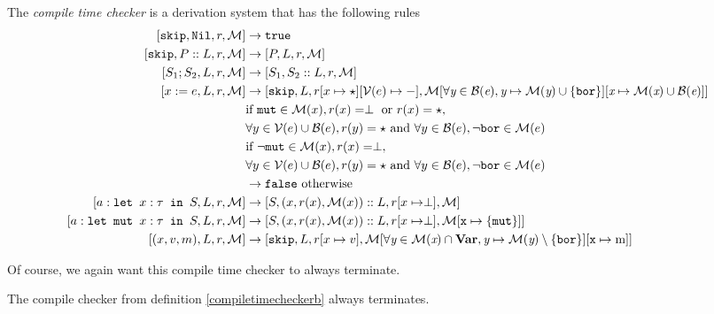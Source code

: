 \begin{definition}
\label{compiletimecheckerb}
The \emph{compile time checker} is a derivation system that has the following rules
\begin{align*}
\ccb{\texttt{skip}}{\texttt{Nil}}{r}{M} & \to \texttt{true}  \\
\ccb{\texttt{skip}}{P::L}{r}{M}       & \to \ccb{P}{L}{r}{M}  \\
\ccb{S_1; S_2}{L}{r}{M}                 & \to \ccb{S_1}{S_2::L}{r}{M}  \\
\ccb{x:=e}{L}{r}{M}                     & \to \ccb{\texttt{skip}}{L}{r[x\mapsto \star][\mathcal{V}(e) \mapsto -]}{M[\forall \textit{y} \in B(\textit{e}), \textit{y}\mapsto M(\textit{y})\cup \{\texttt{bor} \} ][\textit{x} \mapsto M(\textit{x}) \cup B(\textit{e})]} \\
                                    & \textrm{if } \texttt{mut} \in \mathcal{M}(x), r(x) = \perp \textrm{ or } r(x) = \star, \\ &  \forall y \in \mathcal{V}(e) \cup \mathcal{B}(e), r(y) = \star \textrm{ and } \forall y \in \mathcal{B}(e), \neg \texttt{bor} \in \mathcal{M}(e) \\
                                    & \textrm{if } \neg \texttt{mut} \in \mathcal{M}(x), r(x) = \perp,  \\ & \forall y \in \mathcal{V}(e) \cup \mathcal{B}(e), r(y) = \star \textrm{ and } \forall y \in \mathcal{B}(e), \neg \texttt{bor} \in \mathcal{M}(e) \\
                                    & \to \texttt{false} \textrm{ otherwise}\\
\ccb{\letm{x}{S}}{L}{r}{M} & \to \ccb{S}{(x,r(x),\mathcal{M}(x))::L}{r[x\mapsto \perp]}{M} \\
\ccb{\letmut{x}{S}}{L}{r}{M} & \to \ccb{S}{(x,r(x),\mathcal{M}(x))::L}{r[x\mapsto \perp]}{M[\texttt{x}\mapsto\{\texttt{mut}\}]} \\
\ccb{(x,v,m)}{L}{r}{M}                    & \to \ccb{\texttt{skip}}{L}{r[x \mapsto v]}{M[\forall \textit{y} \in M(\textit{x})\cap\textbf{Var}, \textit{y} \mapsto M(\textit{y}) \setminus \{\texttt{bor}\}][\texttt{x} \mapsto \textrm{m}]} 
\end{align*}
\end{definition}

Of course, we again want this compile time checker  to always terminate. 

\begin{theorem}
\label{terminationb}
The compile checker from definition \ref{compiletimecheckerb} always terminates.
\end{theorem}

